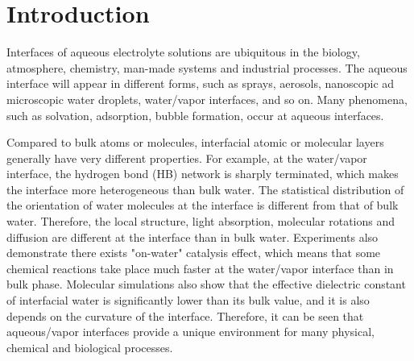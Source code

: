 \chapter{Introduction}\label{CHAPTER_1}
Interfaces of aqueous electrolyte solutions are ubiquitous in the biology, atmosphere, chemistry, man-made systems 
and industrial processes\cite{Irwin88,Tobias99, Benderskii00, 
Asahi01,Benderskii02,Richmond02,LiuH04,
TianCS08,Yamamoto2008, Salmeron2009,ZhangLY09,
LoNostro2012,Piatkowski2014,Balajka2018}.
The aqueous interface will appear in different forms, such as sprays, aerosols, nanoscopic ad  microscopic water droplets, water/vapor interfaces, and so on.
Many phenomena, such as solvation\cite{Benjamin1996}, adsorption\cite{Chang06}, bubble formation\cite{Craig1993,Craig1993b,Weissenborn1995,Marcelja04,Craig04},
occur at aqueous interfaces\cite{Ball2008,Kuo2004b}. 

Compared to bulk atoms or molecules, interfacial atomic or molecular layers generally have very different properties. 
For example, at the water/vapor interface, the hydrogen bond (HB) network is sharply terminated, which makes the interface more heterogeneous 
than bulk water\cite{singh2013}. 
The statistical distribution of the orientation of water molecules at the interface is different from that of bulk water.
Therefore, the local structure, light absorption,  molecular rotations and diffusion are different at the interface than in bulk water\cite{Jedlovszky2004}.
Experiments also demonstrate there exists "on-water" catalysis effect, which means that some chemical reactions take place much faster at the water/vapor 
interface than in bulk phase\cite{Rideout1980,Narayan2005,Beattie2010}.
Molecular simulations also show that the effective dielectric constant of interfacial water is significantly lower than its bulk value, 
and it is also depends on the curvature of the interface\cite{Dinpajooh2016}. 
Therefore, it can be seen that aqueous/vapor interfaces provide a unique environment for many physical, chemical and biological processes. 


